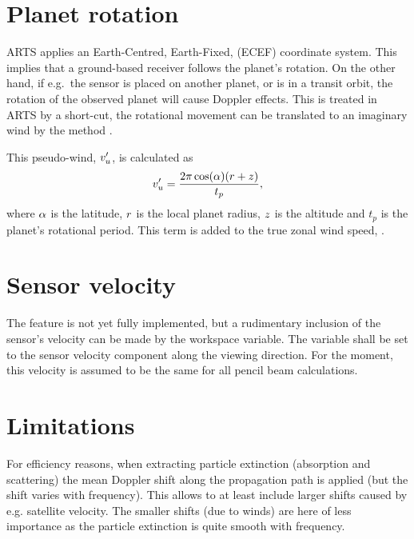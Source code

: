 \section{Planet rotation}

ARTS applies an Earth-Centred, Earth-Fixed, (ECEF) coordinate system. This
implies that a ground-based receiver follows the planet's rotation. On the
other hand, if e.g.\ the sensor is placed on another planet, or is in a transit
orbit, the rotation of the observed planet will cause Doppler effects. This is
treated in ARTS by a short-cut, the rotational movement can be translated to an
imaginary wind by the method .

This pseudo-wind, $v_u'$, is calculated as
\begin{equation}
  v_u' = \frac{2\pi\cos(\alpha)(r+z)}{t_p},
\end{equation}
where $\alpha$ is the latitude, $r$ is the local planet radius, $z$ is the
altitude and $t_p$ is the planet's rotational period. This term is added to the
true zonal wind speed, \WindWE. 



\section{Sensor velocity}

The feature is not yet fully implemented, but a rudimentary inclusion of the
sensor's velocity can be made by the  workspace
variable. The variable shall be set to the sensor velocity component along the
viewing direction. For the moment, this velocity is assumed to be the same for
all pencil beam calculations.


\section{Limitations}
\label{sec:winds:limitations}
%
For efficiency reasons, when extracting particle extinction (absorption and
scattering) the mean Doppler shift along the propagation path is applied (but
the shift varies with frequency). This allows to at least include larger shifts
caused by e.g. satellite velocity. The smaller shifts (due to winds) are here
of less importance as the particle extinction is quite smooth with frequency.

